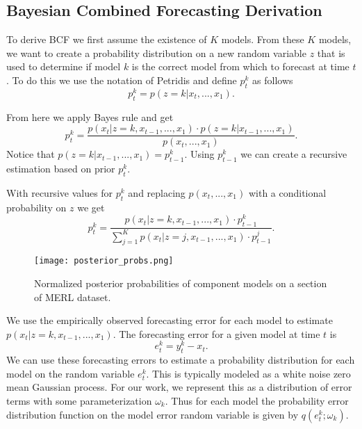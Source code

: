 \subsection{Bayesian Combined Forecasting Derivation}
To derive BCF we first assume the existence of $K$ models.  From these $K$ models, we want to create a probability distribution on a new random variable $z$ that is used to determine if model $k$ is the correct model from which to forecast at time $t$.  To do this we use the notation of Petridis \cite{Petridis2001} and define $p_{t}^{k}$ as follows
\begin{equation}
p_{t}^{k} = p(z = k | x_{t}, ..., x_{1}).
\end{equation}

From here we apply Bayes rule and get
\begin{equation}
p_{t}^{k} = \frac{p(x_{t} | z = k, x_{t - 1}, ..., x_{1}) \cdot p(z = k | x_{t - 1}, ..., x_{1})} {p(x_{t}, ..., x_{1})}.
\end{equation}
\noindent
Notice that $p(z = k | x_{t - 1}, ..., x_{1}) = p_{t - 1}^{k}$.  Using $p_{t - 1}^{k}$ we can create a recursive estimation based on prior $p_{t}^{k}$.

With recursive values for $p_{t}^{k}$ and replacing $p(x_{t}, ..., x_{1})$ with a conditional probability on $z$ we get
\begin{equation}
p_{t}^{k} = \frac{p(x_{t} | z = k, x_{t - 1}, ..., x_{1}) \cdot p_{t - 1}^{k}} {\sum_{j = 1}^{K}p(x_{t} | z = j, x_{t - 1}, ..., x_{1}) \cdot p_{t - 1}^{j}}.
\end{equation}

\begin{figure}[t!]
\centering
\texttt{[image: posterior\_probs.png]}
\caption{Normalized posterior probabilities of component models on a section of MERL dataset.}
\label{fig:probsmerl}
\end{figure}

We use the empirically observed forecasting error for each model to estimate $p(x_{t}|z = k, x_{t - 1}, ..., x_{1})$.  The forecasting error for a given model at time $t$ is 
\begin{equation}
e_{t}^{k} = y_{t}^{k} - x_{t}.
\end{equation}
\noindent
We can use these forecasting errors to estimate a probability distribution for each model on the random variable $e_{t}^{k}$.  This is typically modeled as a white noise zero mean Gaussian process.  For our work, we represent this as a distribution of error terms with some parameterization $\omega_{k}$.  Thus for each model the probability error distribution function on the model error random variable is given by $q(e_{t}^{k};\omega_{k})$.

